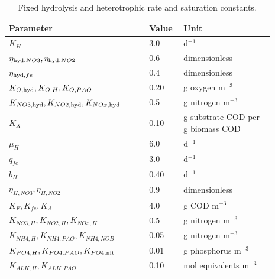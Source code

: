 \begin{table}[htbp]
\centering\small
\caption{Fixed hydrolysis and heterotrophic rate and saturation constants.}
\label{tab:plant_kinetic_constants}
\begin{tabular}{p{0.48\linewidth}p{0.10\linewidth}p{0.31\linewidth}}
\toprule Parameter & Value & Unit\\\midrule
$K_H$ & 3.0 & d$^{-1}$\\
$\eta_{{\rm hyd},NO3},\eta_{{\rm hyd},NO2}$ & 0.6 & dimensionless\\
$\eta_{{\rm hyd},fe}$ & 0.4 & dimensionless\\
$K_{O,\rm hyd},K_{O,H},K_{O,PAO}$ & 0.20 & g oxygen m$^{-3}$\\
$K_{NO3,\rm hyd},K_{NO2,\rm hyd},K_{NOx,\rm hyd}$ & 0.5 & g nitrogen m$^{-3}$\\
$K_X$ & 0.10 & g substrate COD per g biomass COD\\
$\mu_H$ & 6.0 & d$^{-1}$\\
$q_{fe}$ & 3.0 & d$^{-1}$\\
$b_H$ & 0.40 & d$^{-1}$\\
$\eta_{H,NO3},\eta_{H,NO2}$ & 0.9 & dimensionless\\
$K_F,K_{fe},K_A$ & 4.0 & g COD m$^{-3}$\\
$K_{NO3,H},K_{NO2,H},K_{NOx,H}$ & 0.5 & g nitrogen m$^{-3}$\\
$K_{NH4,H},K_{NH4,PAO},K_{NH4,NOB}$ & 0.05 & g nitrogen m$^{-3}$\\
$K_{PO4,H},K_{PO4,PAO},K_{PO4,\rm nit}$ & 0.01 & g phosphorus m$^{-3}$\\
$K_{ALK,H},K_{ALK,PAO}$ & 0.10 & mol equivalents m$^{-3}$\\
\bottomrule
\end{tabular}
\end{table}

